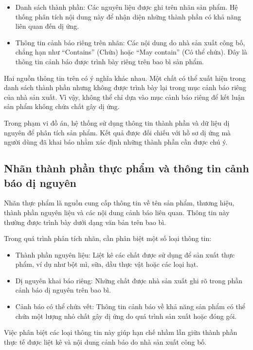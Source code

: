 	\begin{itemize}
		\item Danh sách thành phần: Các nguyên liệu được ghi trên nhãn sản phẩm. Hệ thống phân tích nội dung này để nhận diện những thành phần có khả năng liên quan đến dị ứng.
		\item Thông tin cảnh báo riêng trên nhãn: Các nội dung do nhà sản xuất công bố, chẳng hạn như ``Contains'' (Chứa) hoặc ``May contain'' (Có thể chứa). Đây là thông tin cảnh báo được trình bày riêng trên bao bì sản phẩm.
	\end{itemize}
	
	Hai nguồn thông tin trên có ý nghĩa khác nhau. Một chất có thể xuất
	hiện trong danh sách thành phần nhưng không được trình bày lại trong
	mục cảnh báo riêng của nhà sản xuất. Vì vậy, không thể chỉ dựa vào
	mục cảnh báo riêng để kết luận sản phẩm không chứa chất gây dị ứng.
	
	Trong phạm vi đồ án, hệ thống sử dụng thông tin thành phần và dữ liệu
	dị nguyên để phân tích sản phẩm. Kết quả được đối chiếu với hồ sơ dị
	ứng mà người dùng đã khai báo nhằm xác định những thành phần cần
	được chú ý.
	
	\subsection{Nhãn thành phần thực phẩm và thông tin cảnh báo dị nguyên}
	
	Nhãn thực phẩm là nguồn cung cấp thông tin về tên sản phẩm, thương
	hiệu, thành phần nguyên liệu và các nội dung cảnh báo liên quan.
	Thông tin này thường được trình bày dưới dạng văn bản trên bao bì.
	
	Trong quá trình phân tích nhãn, cần phân biệt một số loại thông tin:
	\begin{itemize}
		\item Thành phần nguyên liệu: Liệt kê các chất được sử dụng để sản xuất thực phẩm, ví dụ như bột mì, sữa, dầu thực vật hoặc các loại hạt.
		\item Dị nguyên khai báo riêng: Những chất được nhà sản xuất ghi rõ trong phần cảnh báo dị nguyên trên bao bì.
		\item Cảnh báo có thể chứa vết: Thông tin cảnh báo về khả năng sản phẩm có thể chứa một lượng nhỏ chất gây dị ứng do quá trình sản xuất hoặc đóng gói.
	\end{itemize}

	Việc phân biệt các loại thông tin này giúp hạn chế nhầm lẫn giữa
	thành phần thực tế được liệt kê và nội dung cảnh báo do nhà sản xuất
	công bố.
	
